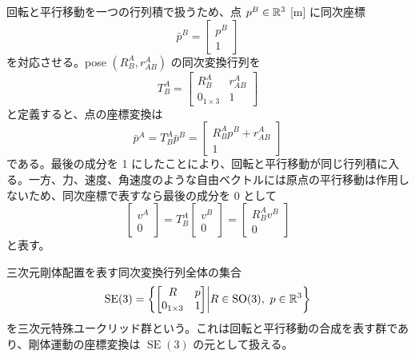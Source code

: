 回転と平行移動を一つの行列積で扱うため、点 $p^B\in\mathbb{R}^3$ [m] に同次座標
\begin{equation}
  \bar{p}^B=
  \begin{bmatrix}
    p^B\\1
  \end{bmatrix}
\end{equation}
を対応させる。pose $(R^A_B,r^A_{AB})$ の同次変換行列を
\begin{equation}
  T^A_B=
  \begin{bmatrix}
    R^A_B&r^A_{AB}\\
    0_{1\times3}&1
  \end{bmatrix}
\end{equation}
と定義すると、点の座標変換は
\begin{equation}
  \bar{p}^A=T^A_B\bar{p}^B
  =
  \begin{bmatrix}
    R^A_Bp^B+r^A_{AB}\\
    1
  \end{bmatrix}
\end{equation}
である。最後の成分を 1 にしたことにより、回転と平行移動が同じ行列積に入る。一方、力、速度、角速度のような自由ベクトルには原点の平行移動は作用しないため、同次座標で表すなら最後の成分を 0 として
\begin{equation}
  \begin{bmatrix}
    v^A\\0
  \end{bmatrix}
  =
  T^A_B
  \begin{bmatrix}
    v^B\\0
  \end{bmatrix}
  =
  \begin{bmatrix}
    R^A_Bv^B\\0
  \end{bmatrix}
\end{equation}
と表す。

\begin{definition}[特殊ユークリッド群]
三次元剛体配置を表す同次変換行列全体の集合
\begin{equation}
  \operatorname{SE}(3)
  =
  \left\{
  \begin{bmatrix}
    R&p\\
    0_{1\times3}&1
  \end{bmatrix}
  \middle|
  R\in\operatorname{SO}(3),\ p\in\mathbb{R}^3
  \right\}
\end{equation}
を三次元特殊ユークリッド群という。これは回転と平行移動の合成を表す群であり、剛体運動の座標変換は $\operatorname{SE}(3)$ の元として扱える。
\end{definition}

